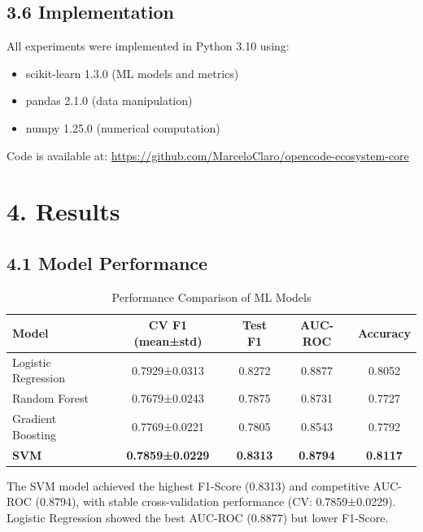 \documentclass[12pt,a4paper]{article}
\begin{document}
\subsection{3.6 Implementation}

All experiments were implemented in Python 3.10 using:
\begin{itemize}
    \item scikit-learn 1.3.0 (ML models and metrics)
    \item pandas 2.1.0 (data manipulation)
    \item numpy 1.25.0 (numerical computation)
\end{itemize}

Code is available at: \url{https://github.com/MarceloClaro/opencode-ecosystem-core}

\section{4. Results}

\subsection{4.1 Model Performance}

\begin{table}[H]
\centering
\caption{Performance Comparison of ML Models}
\begin{tabular}{lcccc}
\toprule
\textbf{Model} & \textbf{CV F1 (mean±std)} & \textbf{Test F1} & \textbf{AUC-ROC} & \textbf{Accuracy} \\
\midrule
Logistic Regression & 0.7929±0.0313 & 0.8272 & 0.8877 & 0.8052 \\
Random Forest & 0.7679±0.0243 & 0.7875 & 0.8731 & 0.7727 \\
Gradient Boosting & 0.7769±0.0221 & 0.7805 & 0.8543 & 0.7792 \\
\textbf{SVM} & \textbf{0.7859±0.0229} & \textbf{0.8313} & \textbf{0.8794} & \textbf{0.8117} \\
\bottomrule
\end{tabular}
\label{tab:performance}
\end{table}

The SVM model achieved the highest F1-Score (0.8313) and competitive 
AUC-ROC (0.8794), with stable cross-validation performance (CV: 0.7859±0.0229). 
Logistic Regression showed the best AUC-ROC (0.8877) but lower F1-Score.
\end{document}
